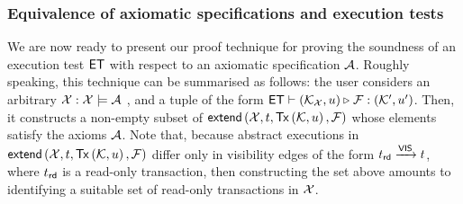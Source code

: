 \subsubsection{Equivalence of axiomatic specifications and execution tests}
We are now ready to present our proof technique for proving the soundness 
of an execution test $\mathsf{ET}$ with respect to an axiomatic specification $\mathcal{A}$.
Roughly speaking, this technique can be summarised as follows: 
the user considers an arbitrary 
$\mathcal{X}: \mathcal{X} \models \mathcal{A}$ , and a tuple of the form 
$\mathsf{ET} \vdash (\mathcal{K}_{\mathcal{X}}, u) \triangleright_{} \mathcal{F}: (\mathcal{K}', u')$. 
Then, it constructs a non-empty subset of $\extend[\aexec, \txid, \Tx[\hh, \vi], \fp]$ 
whose elements satisfy the axioms $\mathcal{A}$. Note that, because abstract executions in
$\extend[\aexec, \txid, \Tx[\hh, \vi], \fp]$ differ only in visibility edges of the form $t_{\mathsf{rd}}
\xrightarrow{\mathsf{VIS}} t$, where $t_{\mathsf{rd}}$ is a read-only transaction, 
then constructing the set above amounts to identifying a suitable set of 
read-only transactions in $\mathcal{X}$.
%
